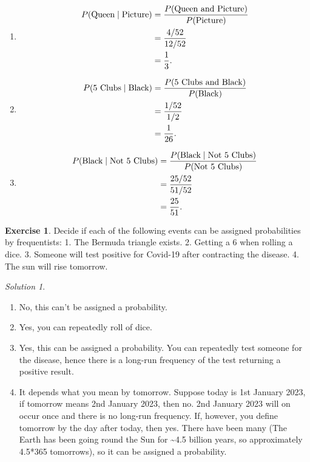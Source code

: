 \documentclass[
]{book}
\providecommand{\tightlist}{%
  \setlength{\itemsep}{0pt}\setlength{\parskip}{0pt}}
\theoremstyle{definition}
\theoremstyle{definition}
\theoremstyle{definition}
\newtheorem{exercise}{Exercise}[chapter]
\theoremstyle{definition}
\theoremstyle{remark}
\newtheorem*{solution}{Solution}
\begin{document}
\begin{enumerate}
\def\labelenumi{\arabic{enumi}.}
\tightlist
\item
  \begin{align*}
  P(\hbox{Queen} \mid \hbox{Picture}) &= \frac{P(\hbox{Queen and Picture})}{P(\hbox{Picture)}} \\
  & = \frac{4/52}{12/52} \\
  & = \frac{1}{3}.
  \end{align*}
\item
  \begin{align*}
  P(\hbox{5 Clubs} \mid \hbox{Black}) &= \frac{P(\hbox{5 Clubs and Black})}{P(\hbox{Black)}} \\
  & = \frac{1/52}{1/2} \\
  & = \frac{1}{26}.
  \end{align*}
\item
  \begin{align*}
  P(\hbox{Black} \mid \hbox{Not 5 Clubs}) & = \frac{P(\hbox{Black} \mid \hbox{Not 5 Clubs})}{P(\hbox{Not 5 Clubs})} \\
  & = \frac{25/52}{51/52}\\
  &= \frac{25}{51}.
  \end{align*}
\end{enumerate}

\begin{exercise}
Decide if each of the following events can be assigned probabilities by frequentists:
1. The Bermuda triangle exists.
2. Getting a 6 when rolling a dice.
3. Someone will test positive for Covid-19 after contracting the disease.
4. The sun will rise tomorrow.
\end{exercise}

\begin{solution}

\begin{enumerate}
\def\labelenumi{\arabic{enumi}.}
\tightlist
\item
  No, this can't be assigned a probability.
\item
  Yes, you can repeatedly roll of dice.
\item
  Yes, this can be assigned a probability. You can repeatedly test someone for the disease, hence there is a long-run frequency of the test returning a positive result.
\item
  It depends what you mean by tomorrow. Suppose today is 1st January 2023, if tomorrow means 2nd January 2023, then no. 2nd January 2023 will on occur once and there is no long-run frequency. If, however, you define tomorrow by the day after today, then yes. There have been many (The Earth has been going round the Sun for \textasciitilde4.5 billion years, so approximately 4.5*365 tomorrows), so it can be assigned a probability.
\end{enumerate}

\end{solution}
\end{document}
